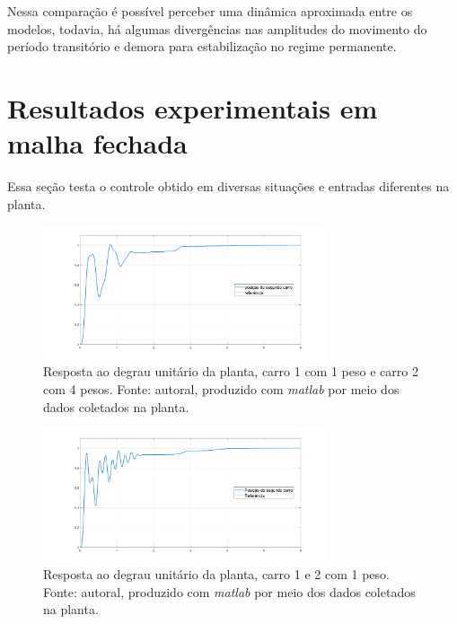 \documentclass{ifacconf}
\begin{document}
Nessa comparação é possível perceber uma dinâmica aproximada entre os modelos, todavia, há algumas divergências nas amplitudes do movimento do período transitório
e demora para estabilização no regime permanente.  

\section{Resultados experimentais em malha fechada}

Essa seção testa o controle obtido em diversas situações e entradas diferentes na planta.


\begin{figure}[!htb]
  \begin{center}
  \includegraphics[width=8.4cm]{figures/resultado_teste1.png}    %
  \caption{Resposta ao degrau unitário da planta, carro 1 com 1 peso e carro 2 com 4 pesos. Fonte: autoral, produzido com \textit{matlab} por meio dos dados coletados na planta.} 
  \label{fig:teste_step1_c1_1p_c2_4p}
  \end{center}
\end{figure}

\begin{figure}[!htb]
  \begin{center}
  \includegraphics[width=8.4cm]{figures/resultado_teste2.png}    %
  \caption{Resposta ao degrau unitário da planta, carro 1 e 2 com 1 peso. Fonte: autoral, produzido com \textit{matlab} por meio dos dados coletados na planta.} 
  \label{fig:teste_step1_c1_1p_c2_1p}
  \end{center}
\end{figure}
\end{document}
